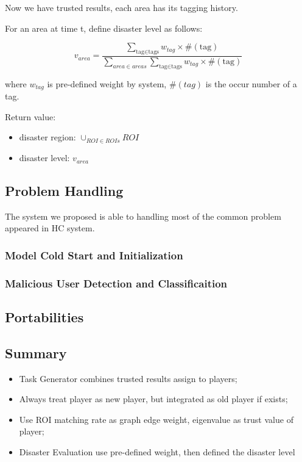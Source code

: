     Now we have trusted results, each area has its tagging history.

    For an area at time t, define disaster level as follows:

    \[
    v_{area} = \frac{
    \sum_{\text{tag}\in\text{tags}}
      {w_{tag}\times\#(\text{tag})}
    }
    {\sum_{area\in areas}{\sum_{\text{tag}\in\text{tags}}{w_{tag}\times\#(\text{tag})}}}
    \]

    where $w_{tag}$ is pre-defined weight by system, $\#(tag)$ is the occur number of a tag.

    Return value:

    \begin{itemize}
      \item disaster region: $\cup_{ROI\in ROIs}{ROI}$
      \item disaster level: $v_{area}$
    \end{itemize}


\subsection{Problem Handling}

The system we proposed is able to handling most of the common problem appeared in HC system.

\subsubsection{Model Cold Start and Initialization}

\subsubsection{Malicious User Detection and Classificaition}

\subsection{Portabilities}


\subsection{Summary}

    \begin{itemize}
      \item Task Generator combines trusted results assign to players;
      \item Always treat player as new player, but integrated as old player if exists;
      \item Use ROI matching rate as graph edge weight, eigenvalue as trust value of player;
      \item Disaster Evaluation use pre-defined weight, then defined the disaster level
    \end{itemize}
